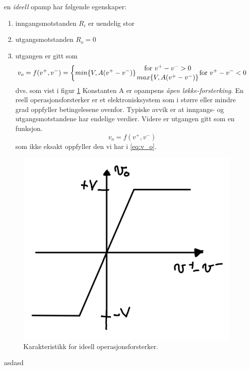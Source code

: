 en \textit{ideell} opamp har følgende egenskaper:
\begin{enumerate}
    \item inngangsmotstanden $R_i$ er uendelig stor
    \item utgangsmotstanden $R_o = 0$
    \item utgangen er gitt som \newline \begin{equation} v_o=f(v^+,v^-) = \biggl\{ {{min\{V,A(v^+-v^-)\}}  {{\text{for } v^+-v^->0} \atop {max\{V,A(v^+-v^-)\}}} {\text{for } v^+-v^-<0}} \label{eq:v_o} \end{equation} \newline dvs. som vist i figur \ref{fig:02karakteristikk} Konstanten A er opampens \textit{åpen løkke-forsterking}. En reell operasjonsforsterker er et elektronisksystem som i større eller mindre grad oppfyller betingelesene ovenfor. Typiske avvik er at inngangs- og utgangsmotstandene har endelige verdier. Videre er utgangen gitt som en funksjon. \newline \begin{equation} v_o=f(v^+,v^-) \end{equation} \newline som ikke eksakt oppfyller den vi har i \ref{eq:v_o}.
\end{enumerate}
\begin{figure}[!hbt]
	\centering
	\includegraphics[scale=0.5]{./Images/01Issue/02_karakteristikk.png}
	\caption{ Karakteristikk for ideell operasjonsforsterker.}
	\label{fig:02karakteristikk}
\end{figure}


asdasd